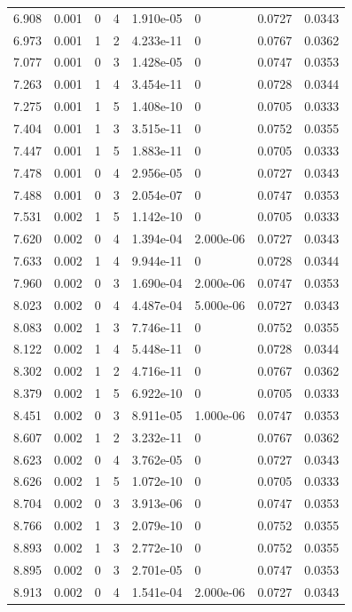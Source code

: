 \documentclass[preview]{standalone}
\begin{document}
{{{\begin{tabular}{L{1.2cm}C{1.2cm} C{0.3cm}C{0.5cm} C{1.4cm}C{1.4cm} C{1.4cm}C{1.4cm}}
  6.908  &  0.001  & 0     &  4 &  1.910e-05  & 0  & 0.0727 &  0.0343   \\ 
  6.973  &  0.001  & 1     &  2 &  4.233e-11  & 0  & 0.0767 &  0.0362   \\ 
  7.077  &  0.001  & 0     &  3 &  1.428e-05  & 0  & 0.0747 &  0.0353   \\ 
  7.263  &  0.001  & 1     &  4 &  3.454e-11  & 0  & 0.0728 &  0.0344   \\ 
  7.275  &  0.001  & 1     &  5 &  1.408e-10  & 0  & 0.0705 &  0.0333   \\ 
  7.404  &  0.001  & 1     &  3 &  3.515e-11  & 0  & 0.0752 &  0.0355   \\ 
  7.447  &  0.001  & 1     &  5 &  1.883e-11  & 0  & 0.0705 &  0.0333   \\ 
  7.478  &  0.001  & 0     &  4 &  2.956e-05  & 0  & 0.0727 &  0.0343   \\ 
  7.488  &  0.001  & 0     &  3 &  2.054e-07  & 0  & 0.0747 &  0.0353   \\ 
  7.531  &  0.002  & 1     &  5 &  1.142e-10  & 0  & 0.0705 &  0.0333   \\ 
  7.620  &  0.002  & 0     &  4 &  1.394e-04  & 2.000e-06  & 0.0727 &  0.0343   \\ 
  7.633  &  0.002  & 1     &  4 &  9.944e-11  & 0  & 0.0728 &  0.0344   \\ 
  7.960  &  0.002  & 0     &  3 &  1.690e-04  & 2.000e-06  & 0.0747 &  0.0353   \\ 
  8.023  &  0.002  & 0     &  4 &  4.487e-04  & 5.000e-06  & 0.0727 &  0.0343   \\ 
  8.083  &  0.002  & 1     &  3 &  7.746e-11  & 0  & 0.0752 &  0.0355   \\ 
  8.122  &  0.002  & 1     &  4 &  5.448e-11  & 0  & 0.0728 &  0.0344   \\ 
  8.302  &  0.002  & 1     &  2 &  4.716e-11  & 0  & 0.0767 &  0.0362   \\ 
  8.379  &  0.002  & 1     &  5 &  6.922e-10  & 0  & 0.0705 &  0.0333   \\ 
  8.451  &  0.002  & 0     &  3 &  8.911e-05  & 1.000e-06  & 0.0747 &  0.0353   \\ 
  8.607  &  0.002  & 1     &  2 &  3.232e-11  & 0  & 0.0767 &  0.0362   \\ 
  8.623  &  0.002  & 0     &  4 &  3.762e-05  & 0  & 0.0727 &  0.0343   \\ 
  8.626  &  0.002  & 1     &  5 &  1.072e-10  & 0  & 0.0705 &  0.0333   \\ 
  8.704  &  0.002  & 0     &  3 &  3.913e-06  & 0  & 0.0747 &  0.0353   \\ 
  8.766  &  0.002  & 1     &  3 &  2.079e-10  & 0  & 0.0752 &  0.0355   \\ 
  8.893  &  0.002  & 1     &  3 &  2.772e-10  & 0  & 0.0752 &  0.0355   \\ 
  8.895  &  0.002  & 0     &  3 &  2.701e-05  & 0  & 0.0747 &  0.0353   \\ 
  8.913  &  0.002  & 0     &  4 &  1.541e-04  & 2.000e-06  & 0.0727 &  0.0343   \\ 
\hline 
\end{tabular} 

}}}
\end{document}
